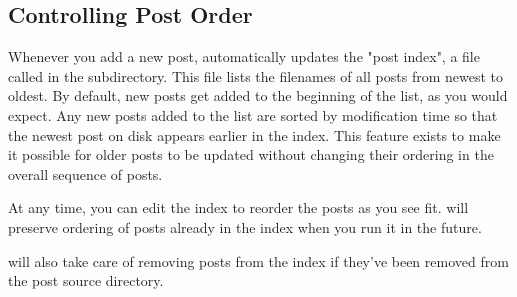 \documentclass[11pt, letterpaper, oneside, titlepage]{book}
\begin{document}
\subsection{Controlling Post Order}

Whenever you add a new post,  automatically updates the "post
index", a file called  in the 
subdirectory.  This file lists the filenames of all posts from newest
to oldest.  By default, new posts get added to the beginning of the
list, as you would expect.  Any new posts added to the list are sorted
by modification time so that the newest post on disk appears earlier
in the index.  This feature exists to make it possible for older posts
to be updated without changing their ordering in the overall sequence
of posts.

At any time, you can edit the index to reorder the posts as you see
fit.   will preserve ordering of posts already in the index
when you run it in the future.

 will also take care of removing posts from the index if
they've been removed from the post source directory.
\end{document}
